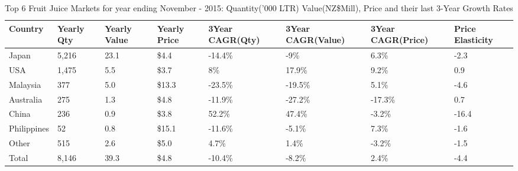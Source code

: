 \begin{table}[ht]
\centering
{\scriptsize
\begin{tabular}[t]{p{1.8cm}>{\hfill}p{1.4cm}>{\hfill}p{1.4cm}>{\hfill}p{1.6cm}>{\hfill}p{1.9cm}>{\hfill}p{2cm}>{\hfill}p{1.9cm}>{\hfill}p{1.5cm}}
 \textbf{Country} & \textbf{Yearly Qty} & \textbf{Yearly Value} & \textbf{Yearly Price} & \textbf{3Year CAGR(Qty)} & \textbf{3Year CAGR(Value)} & \textbf{3Year CAGR(Price)} & \textbf{Price Elasticity} \\
\hline
Japan & 5,216 & 23.1 & \$4.4 & -14.4\% & -9\% & 6.3\% & -2.3 \\  
USA & 1,475 & 5.5 & \$3.7 & 8\% & 17.9\% & 9.2\% & 0.9 \\  
Malaysia & 377 & 5.0 & \$13.3 & -23.5\% & -19.5\% & 5.1\% & -4.6 \\  
Australia & 275 & 1.3 & \$4.8 & -11.9\% & -27.2\% & -17.3\% & 0.7 \\  
China & 236 & 0.9 & \$3.8 & 52.2\% & 47.4\% & -3.2\% & -16.4 \\  
Philippines & 52 & 0.8 & \$15.1 & -11.6\% & -5.1\% & 7.3\% & -1.6 \\  
Other & 515 & 2.6 & \$5.0 & 4.7\% & 1.4\% & -3.2\% & -1.5 \\  
Total & 8,146 & 39.3 & \$4.8 & -10.4\% & -8.2\% & 2.4\% & -4.4 \\  
\hline
\end{tabular}
}
\caption{\scriptsize Top 6 Fruit Juice Markets for year ending November - 2015: Quantity('000 LTR) Value(NZ\$Mill), Price and their last 3-Year Growth Rates}
\end{table}

